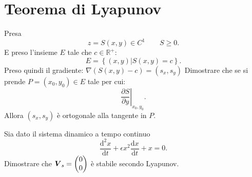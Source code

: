 \section{Teorema di Lyapunov}%
\begin{ex}
    Presa 
    \[
	z = S(x, y) \in C^1 \qquad S\ge 0
    .\] 
    E preso l'insieme $E$ tale che $c \in \mathbb{R}^+$: 
    \[
	E = \left\{(x, y) | S(x, y) = c\right\}
    .\] 
    Preso quindi il gradiente:
    $\nabla (S(x, y) -c) = (s_x, s_y) $ 
    Dimostrare che se si prende $P = (x_0, y_0) \in E$ tale per cui:
    \[
        \left. \frac{\partial S}{\partial y} \right|_{x_0, y_0}
    .\] 
    Allora $(s_x, s_y)$ è ortogonale alla tangente in $P$.
\end{ex}
\noindent
\begin{ex}
    Sia dato il sistema dinamico a tempo continuo 
    \[
        \frac{\text{d}^2 x}{\text{d} t} + \epsilon x^2 \frac{\text{d} x}{\text{d} t} + x = 0 
    .\] 
    Dimostrare che $\boldsymbol{V}_s = \begin{pmatrix} 0 \\ 0 \end{pmatrix}$ è stabile secondo Lyapunov.
\end{ex}
